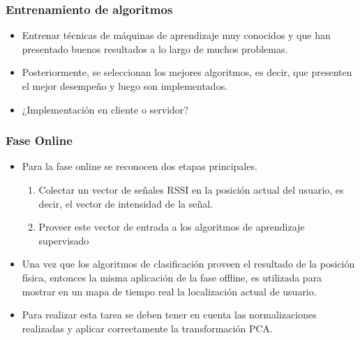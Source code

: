 \documentclass[mathserif]{beamer}
\begin{document}

\begin{frame}
\frametitle{Entrenamiento de algoritmos}

\begin{itemize}

\item Entrenar técnicas de máquinas de aprendizaje muy conocidos y que han presentado buenos resultados a lo largo de muchos problemas.

\pause
\item Posteriormente, se seleccionan los mejores algoritmos, es decir, que presenten el mejor desempeño y luego son implementados.
\pause

\item ¿Implementación en cliente o servidor?

\end{itemize}

\end{frame}


\begin{frame}
\frametitle{Fase Online}

\begin{itemize}

\item Para la fase online se reconocen dos etapas principales.

\begin{enumerate}
\pause
\item Colectar un vector de señales RSSI en la posición actual del usuario, es decir, el vector de intensidad de la señal.
\pause
\item Proveer este vector de entrada a los algoritmos de aprendizaje supervisado
\end{enumerate}

\pause
\item Una vez que los algoritmos de clasificación proveen el resultado de la posición física, entonces la misma aplicación de la fase offline, es utilizada para mostrar en un mapa de tiempo real la localización actual de usuario.

\pause

\item Para realizar esta tarea se deben tener en cuenta las normalizaciones realizadas y aplicar correctamente la transformación PCA.


\end{itemize}
\end{frame}
\end{document}
